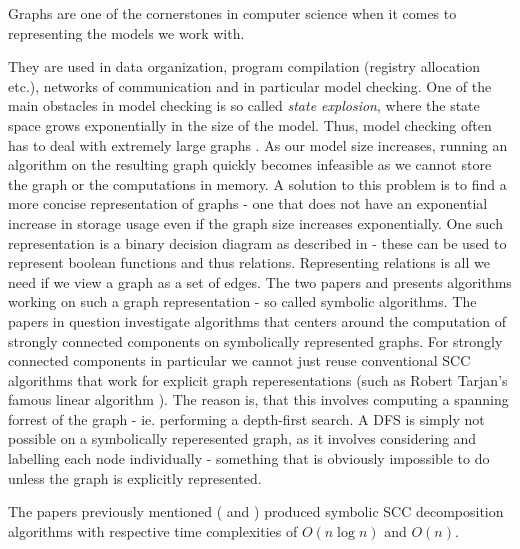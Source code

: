 \documentclass[../master/master.tex]{subfiles}
\begin{document}
Graphs are one of the cornerstones in computer science when it comes to representing the models we work with. 

They are used in data organization,  program compilation (registry allocation etc.), networks of communication and in particular model checking. One of the main obstacles in model checking is so called \textit{state explosion}, where the state space grows exponentially in the size of the model. Thus, model checking often has to deal with extremely large graphs \cite{pelanek_2004}. As our model size increases, running an algorithm on the resulting graph quickly becomes infeasible as we cannot store the graph or the computations in memory. A solution to this problem is to find a more concise representation of graphs - one that does not have an exponential increase in storage usage even if the graph size increases exponentially. One such representation is a binary decision diagram as described in \cite{bryant_1992} - these can be used to represent boolean functions and thus relations. Representing relations is all we need if we view a graph as a set of edges. The two papers \cite{linear} and \cite{lockstep} presents algorithms working on such a graph representation - so called symbolic algorithms. The papers in question investigate algorithms that centers around the computation of strongly connected components on symbolically represented graphs. For strongly connected components in particular we cannot just reuse conventional SCC algorithms that work for explicit graph reperesentations (such as Robert Tarjan's famous linear algorithm \cite{tarjan_1971}). The reason is, that this involves computing a spanning forrest of the graph - ie. performing a depth-first search. A DFS is simply not possible on a symbolically reperesented graph, as it involves considering and labelling each node individually - something that is obviously impossible to do unless the graph is explicitly represented. 

The papers previously mentioned (\cite{linear} and \cite{lockstep}) produced symbolic SCC decomposition algorithms with respective time complexities of $O(n \log n)$ and $O(n)$.
\end{document}
